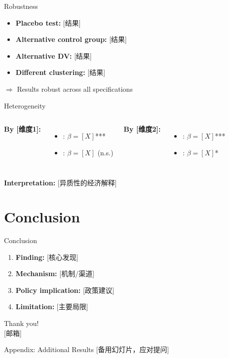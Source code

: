 \documentclass[aspectratio=169,11pt]{beamer}
\begin{document}
\begin{frame}{Robustness}
\begin{itemize}
    \item \textcolor{green!50!black}{\checkmark} \textbf{Placebo test:} [结果]
    \item \textcolor{green!50!black}{\checkmark} \textbf{Alternative control group:} [结果]
    \item \textcolor{green!50!black}{\checkmark} \textbf{Alternative DV:} [结果]
    \item \textcolor{green!50!black}{\checkmark} \textbf{Different clustering:} [结果]
\end{itemize}
\vspace{0.5em}
$\Rightarrow$ Results robust across all specifications
\end{frame}

\begin{frame}{Heterogeneity}
\begin{columns}
\textbf{By [维度1]:}
\begin{itemize}
    \item [子组A]: $\beta = [X]$***
    \item [子组B]: $\beta = [X]$ (n.s.)
\end{itemize}

\textbf{By [维度2]:}
\begin{itemize}
    \item [子组C]: $\beta = [X]$***
    \item [子组D]: $\beta = [X]$*
\end{itemize}
\end{columns}

\vspace{1em}
\textbf{Interpretation:} [异质性的经济解释]
\end{frame}


\section{Conclusion}

\begin{frame}{Conclusion}
\begin{enumerate}
    \item \textbf{Finding:} [核心发现]
    \vspace{0.5em}
    \item \textbf{Mechanism:} [机制/渠道]
    \vspace{0.5em}
    \item \textbf{Policy implication:} [政策建议]
    \vspace{0.5em}
    \item \textbf{Limitation:} [主要局限]
\end{enumerate}

\vspace{1em}
\centering
\Large Thank you! \\
\normalsize [邮箱]
\end{frame}


\appendix

\begin{frame}[noframenumbering]{Appendix: Additional Results}
[备用幻灯片，应对提问]
\end{frame}
\end{document}
